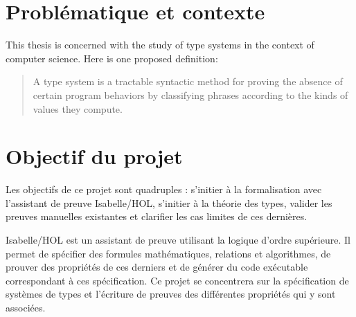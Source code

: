 \documentclass[letterpaper
, twoside
, 12pt
,these
,francais
,creativecommons,hyperref
]{thETS}
\begin{document}

\chapter{Problématique et contexte}


This thesis is concerned with the study of type systems in the context of computer science. Here is
one proposed definition:

\begin{quotation} %
  A type system is a tractable syntactic method for proving the absence of certain program behaviors
  by classifying phrases according to the kinds of values they compute.
\end{quotation}

\chapter{Objectif du projet}



Les objectifs de ce projet sont quadruples : s'initier à la formalisation avec l'assistant de preuve
Isabelle/HOL, s'initier à la théorie des types, valider les preuves manuelles existantes et
clarifier les cas limites de ces dernières.

Isabelle/HOL est un assistant de preuve utilisant la logique d'ordre supérieure. Il permet de
spécifier des formules mathématiques, relations et algorithmes, de prouver des propriétés de ces
derniers et de générer du code exécutable correspondant à ces spécification. Ce projet se
concentrera sur la spécification de systèmes de types et l'écriture de preuves des différentes
propriétés qui y sont associées.
\end{document}
